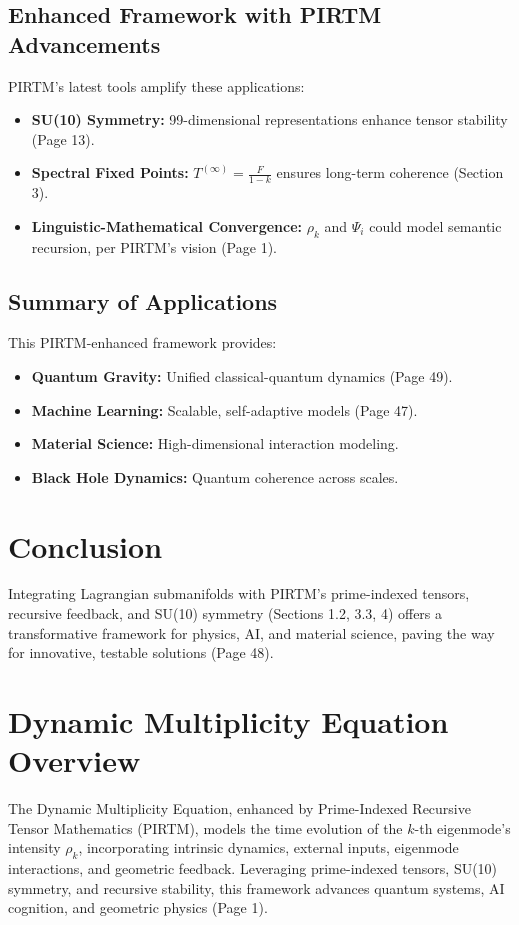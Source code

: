 \documentclass{article}
\theoremstyle{plain}
\begin{document}
\subsection{Enhanced Framework with PIRTM Advancements}
PIRTM’s latest tools amplify these applications:
\begin{itemize}
    \item \textbf{SU(10) Symmetry:} 99-dimensional representations enhance tensor stability (Page 13).
    \item \textbf{Spectral Fixed Points:} \( T^{(\infty)} = \frac{F}{1 - k} \) ensures long-term coherence (Section 3).
    \item \textbf{Linguistic-Mathematical Convergence:} \( \rho_k \) and \( \Psi_i \) could model semantic recursion, per PIRTM’s vision (Page 1).
\end{itemize}

\subsection*{Summary of Applications}
This PIRTM-enhanced framework provides:
\begin{itemize}
    \item \textbf{Quantum Gravity:} Unified classical-quantum dynamics (Page 49).
    \item \textbf{Machine Learning:} Scalable, self-adaptive models (Page 47).
    \item \textbf{Material Science:} High-dimensional interaction modeling.
    \item \textbf{Black Hole Dynamics:} Quantum coherence across scales.
\end{itemize}

\section{Conclusion}
Integrating Lagrangian submanifolds with PIRTM’s prime-indexed tensors, recursive feedback, and SU(10) symmetry (Sections 1.2, 3.3, 4) offers a transformative framework for physics, AI, and material science, paving the way for innovative, testable solutions (Page 48).


\section*{Dynamic Multiplicity Equation Overview}

The Dynamic Multiplicity Equation, enhanced by Prime-Indexed Recursive Tensor Mathematics (PIRTM), models the time evolution of the \( k \)-th eigenmode’s intensity \( \rho_k \), incorporating intrinsic dynamics, external inputs, eigenmode interactions, and geometric feedback. Leveraging prime-indexed tensors, SU(10) symmetry, and recursive stability, this framework advances quantum systems, AI cognition, and geometric physics (Page 1).
\end{document}
